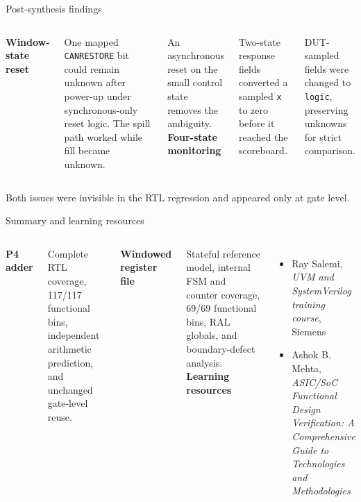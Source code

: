 \documentclass[aspectratio=169,11pt]{beamer}
\newcommand{\code}[1]{\texttt{#1}}
\newcommand{\key}[1]{{\color{teal}\bfseries #1}}
\begin{document}
\begin{frame}{Post-synthesis findings}
\begin{columns}[T,onlytextwidth]
\key{Window-state reset}\par\vspace{0.35em}
One mapped \code{CANRESTORE} bit could remain unknown after power-up under synchronous-only reset logic. The spill path worked while fill became unknown.

\vspace{0.45em}
An asynchronous reset on the small control state removes the ambiguity.
\key{Four-state monitoring}\par\vspace{0.35em}
Two-state response fields converted a sampled \code{x} to zero before it reached the scoreboard.

\vspace{0.45em}
DUT-sampled fields were changed to \code{logic}, preserving unknowns for strict comparison.
\end{columns}
\vspace{0.7em}
\centering
Both issues were invisible in the RTL regression and appeared only at gate level.
\end{frame}

\begin{frame}{Summary and learning resources}
\begin{columns}[T,onlytextwidth]
\key{P4 adder}\par
Complete RTL coverage, 117/117 functional bins, independent arithmetic prediction, and unchanged gate-level reuse.

\vspace{0.65em}
\key{Windowed register file}\par
Stateful reference model, internal FSM and counter coverage, 69/69 functional bins, RAL globals, and boundary-defect analysis.
\key{Learning resources}\par\vspace{0.35em}
\begin{itemize}
  \item Ray Salemi, \emph{UVM and SystemVerilog training course}, Siemens
  \item Ashok B. Mehta, \emph{ASIC/SoC Functional Design Verification: A Comprehensive Guide to Technologies and Methodologies}
\end{itemize}
\end{columns}
\end{frame}
\end{document}
